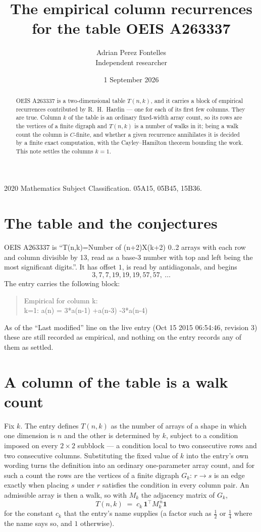 \documentclass[11pt,a4paper]{article}
\title{The empirical column recurrences for the table OEIS A263337}
\author{Adrian Perez Fontelles\\ \small Independent researcher}
\date{1 September 2026}
\theoremstyle{plain}
\theoremstyle{definition}
\begin{document}
\maketitle

\begin{abstract}
OEIS A263337 is a two-dimensional table $T(n,k)$, and it carries a block of empirical
recurrences contributed by R.~H.~Hardin --- one for each of its first few columns. They are
true. Column $k$ of the table is an ordinary fixed-width array count, so its rows are the
vertices of a finite digraph and $T(n,k)$ is a number of walks in it; being a walk count the
column is $C$-finite, and whether a given recurrence annihilates it is decided by a finite
exact computation, with the Cayley--Hamilton theorem bounding the work. This note settles the columns $k=1$.
\end{abstract}

\noindent\small 2020 Mathematics Subject Classification. 05A15, 05B45, 15B36.\normalsize

\section{The table and the conjectures}

OEIS A263337 is ``T(n,k)=Number of (n+2)X(k+2) 0..2 arrays with each row and column divisible by 13, read as a base-3 number with top and left being the most significant digits.''. It has offset $1$, is
read by antidiagonals, and begins
\[
3, 7, 7, 19, 19, 19, 57, 57,\ \dots
\]
The entry carries the following block:
\begin{quote}\small
Empirical for column k:\\
k=1: a(n) = 3*a(n-1) +a(n-3) -3*a(n-4)\\
\end{quote}
As of the ``Last modified'' line on the live entry (Oct 15 2015 06:54:46, revision 3) these are still
recorded as empirical, and nothing on the entry records any of them as settled.

\section{A column of the table is a walk count}

Fix $k$. The entry defines $T(n,k)$ as the number of arrays of a shape in which one dimension
is $n$ and the other is determined by $k$, subject to a condition imposed on every
$2\times2$ subblock --- a condition local to two consecutive rows and two consecutive columns.
Substituting the fixed value of $k$ into the entry's own wording turns the definition into an
ordinary one-parameter array count, and for such a count the rows are the vertices of a finite
digraph $G_k$: $r\to s$ is an edge exactly when placing $s$ under $r$ satisfies the condition
in every column pair. An admissible array is then a walk, so with $M_k$ the adjacency matrix
of $G_k$,
\[
T(n,k)\;=\;c_k\,\mathbf{1}^{\!\top}M_k^{\,n}\mathbf{1}
\]
for the constant $c_k$ that the entry's name supplies (a factor such as $\tfrac12$ or
$\tfrac14$ where the name says so, and $1$ otherwise).
\end{document}
